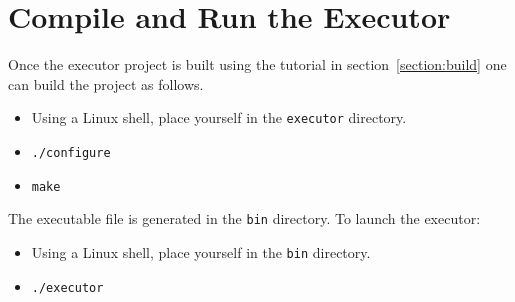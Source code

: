 
\section{Compile and Run the Executor}
Once the executor project is built using the tutorial in section~\ref{section:build} one can build the project as follows.

\begin{itemize}
\item Using a Linux shell, place yourself in the \texttt{executor} directory.
\item \texttt{./configure}
\item \texttt{make}
\end{itemize}

The executable file  is generated in the \texttt{bin} directory. To launch the executor:
\begin{itemize}
\item Using a Linux shell, place yourself in the \texttt{bin} directory.
\item \texttt{./executor}
\end{itemize}